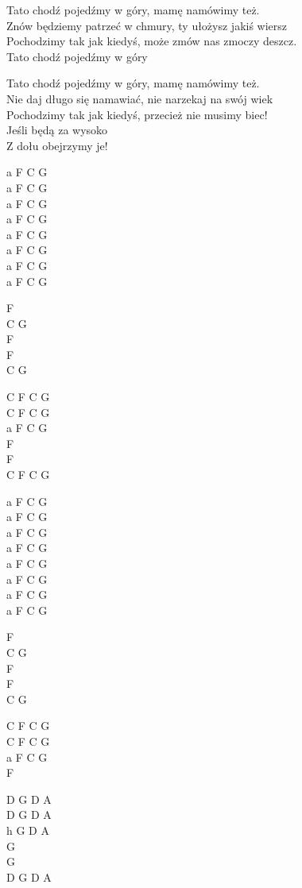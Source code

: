 \begin{text}
    Tato chodź pojedźmy w góry, mamę namówimy też.\\
    Znów będziemy patrzeć w chmury, ty ułożysz jakiś wiersz\\
    Pochodzimy tak jak kiedyś, może zmów nas zmoczy deszcz.\\
    Tato chodź pojedźmy w góry

    Tato chodź pojedźmy w góry, mamę namówimy też. \\
    Nie daj długo się namawiać, nie narzekaj na swój wiek \\
    Pochodzimy tak jak kiedyś, przecież nie musimy biec!\\
    Jeśli będą za wysoko\\
    Z dołu obejrzymy je!


\end{text}
\begin{chord}
    a F C G\\
    a F C G\\
    a F C G\\
    a F C G\\
    a F C G\\
    a F C G\\
    a F C G\\
    a F C G

    F\\
    C G\\
    F\\
    F\\
    C G

    C F C G\\
    C F C G\\
    a F C G\\
    F\\
    F\\
    C F C G

    a F C G\\
    a F C G\\
    a F C G\\
    a F C G\\
    a F C G\\
    a F C G\\
    a F C G\\
    a F C G

    F\\
    C G\\
    F\\
    F\\
    C G

    C F C G\\
    C F C G\\
    a F C G\\
	F

    D G D A\\
    D G D A\\
    h G D A\\
    G\\
    G\\
    D G D A

\end{chord}